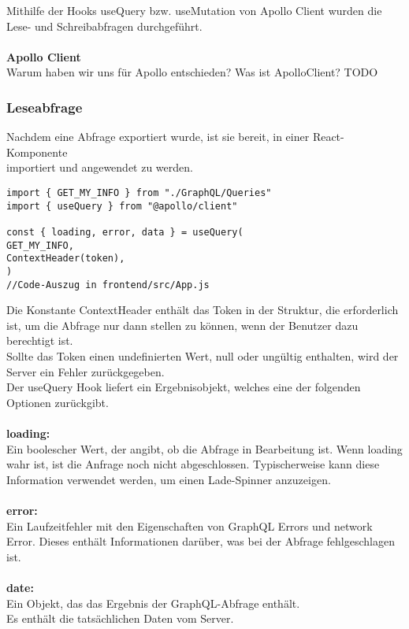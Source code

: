 Mithilfe der Hooks useQuery bzw. useMutation von Apollo Client wurden die Lese- und Schreibabfragen durchgeführt.
\\\\
\textbf{Apollo Client}\\
Warum haben wir uns für Apollo entschieden? Was ist ApolloClient?
TODO
\newpage

\subsubsection{Leseabfrage}
Nachdem eine Abfrage exportiert wurde, ist sie bereit, in einer React-Komponente \\
importiert und angewendet zu werden.

\begin{lstlisting}
import { GET_MY_INFO } from "./GraphQL/Queries"
import { useQuery } from "@apollo/client"

const { loading, error, data } = useQuery(
GET_MY_INFO,
ContextHeader(token),
)
//Code-Auszug in frontend/src/App.js

\end{lstlisting}
Die Konstante ContextHeader enthält das Token in der Struktur, die erforderlich ist, um die Abfrage nur dann stellen zu können, wenn der Benutzer dazu berechtigt ist.
\\
Sollte das Token einen undefinierten Wert, null oder ungültig enthalten, wird der Server ein Fehler zurückgegeben.
\\
Der useQuery Hook liefert ein Ergebnisobjekt, welches eine der folgenden Optionen zurückgibt.
\\\\
\textbf{loading:}\\
Ein boolescher Wert, der angibt, ob die Abfrage in Bearbeitung ist.
Wenn loading wahr ist, ist die Anfrage noch nicht abgeschlossen. Typischerweise kann diese Information verwendet werden, um einen Lade-Spinner anzuzeigen.
\\\\
\textbf{error:}\\
Ein Laufzeitfehler mit den Eigenschaften von GraphQL Errors und network Error.
Dieses enthält Informationen darüber, was bei der Abfrage fehlgeschlagen  ist.
\\\\
\textbf{date:}\\
Ein Objekt, das das Ergebnis der GraphQL-Abfrage enthält.
\\Es enthält die tatsächlichen Daten vom Server.
\newpage
